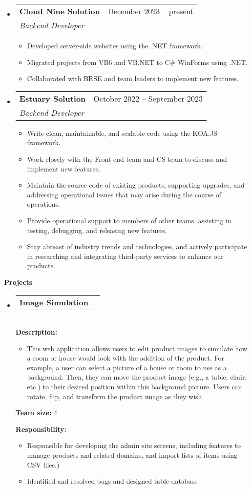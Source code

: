 \documentclass[letterpaper,12pt]{article}[leftmargin=*]
\makeatletter
\def \entryspacing {-0pt}
\renewcommand{\section}[2]{\vspace{5pt}
  \colorbox{secondary}{\color{white}\raggedbottom\normalsize\textbf{{#1}{\hspace{7pt}#2}}}
}
\newcommand{\resumeEntryStart}{\begin{itemize}[leftmargin=2.5mm]}
\newcommand{\resumeEntryEnd}{\end{itemize}\vspace{\entryspacing}}
\newcommand{\resumeItemListStart}{\begin{itemize}[leftmargin=4.5mm]}
\newcommand{\resumeItemListEnd}{\end{itemize}}
\newcommand{\resumeItem}[1]{
  \item\small{
    {#1 \vspace{-2pt}}
  }
}
\newcommand{\resumeEntryTSDL}[4]{
  \vspace{-1pt}\item[]
    \begin{tabularx}{0.97\textwidth}{X@{\hspace{60pt}}r}
      \textbf{\color{primary}#1} & {\firabook\color{accent}\small#2} \\
      \textit{\color{accent}\small#3} & \textit{\color{accent}\small#4} \\
    \end{tabularx}\vspace{-6pt}
}
\newcommand{\resumeEntryTD}[2]{
  \vspace{-1pt}\item[]
    \begin{tabularx}{0.97\textwidth}{X@{\hspace{60pt}}r}
      \textbf{\color{primary}#1} & {\firabook\color{accent}\small#2} \\
    \end{tabularx}\vspace{-6pt}
}
\makeatother
\begin{document}
  \resumeEntryStart
    \resumeEntryTSDL
      {Cloud Nine Solution}{December 2023 -- present}
      {Backend Developer}{}
    \resumeItemListStart
      \resumeItem {Developed server-side websites using the .NET framework.}
      \resumeItem{Migrated projects from VB6 and VB.NET to C# WinForms using .NET.}
      \resumeItem{Collaborated with BRSE and team leaders to implement new features.}
    \resumeItemListEnd
    \resumeEntryTSDL
      {Estuary Solution}{October 2022 -- September 2023}
      {Backend Developer}{}
    \resumeItemListStart
      \resumeItem {Write clean, maintainable, and scalable code using the KOA.JS framework.}
      \resumeItem {Work closely with the Front-end team and CS team to discuss and implement new features.}
      \resumeItem {Maintain the source code of existing products, supporting upgrades, and addressing operational issues that may arise during the course of operations.}
      \resumeItem{Provide operational support to members of other teams, assisting in testing, debugging, and releasing new features.}
      \resumeItem{Stay abreast of industry trends and technologies, and actively participate in researching and integrating third-party services to enhance our products.}
    \resumeItemListEnd
  \resumeEntryEnd

\section{\faFlask}{Projects}


  \resumeEntryStart
    \resumeEntryTD
      { Image Simulation}{}

        \textbf{\\Description: }
        
            \resumeItemListStart
              \resumeItem {This web application allows users to edit product images to simulate how a room or house would look with the addition of the product. For example, a user can select a picture of a house or room to use as a background. Then, they can move the product image (e.g., a table, chair, etc.) to their desired position within this background picture. Users can rotate, flip, and transform the product image as they wish.}
            \resumeItemListEnd


        \textbf{Team size: }4

        
        \textbf{Responsibility: }
            \resumeItemListStart
                \resumeItem{Responsible for developing the admin site screens, including features to manage products and related domains, and import lists of items using CSV files.)}
                \resumeItem{Identified and resolved bugs and designed table database}
            \resumeItemListEnd
  \resumeEntryEnd
  
\end{document}
